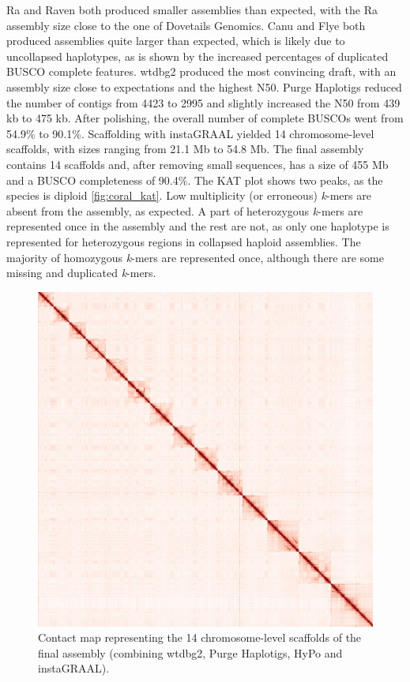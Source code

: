 Ra and Raven both produced smaller assemblies than expected, with the Ra assembly size close to the one of Dovetails Genomics. Canu and Flye both produced assemblies quite larger than expected, which is likely due to uncollapsed haplotypes, as is shown by the increased percentages of duplicated BUSCO complete features. wtdbg2 produced the most convincing draft, with an assembly size close to expectations and the highest N50. Purge Haplotigs reduced the number of contigs from 4423 to 2995 and slightly increased the N50 from 439 kb to 475 kb. After polishing, the overall number of complete BUSCOs went from 54.9\% to 90.1\%. Scaffolding with instaGRAAL yielded 14 chromosome-level scaffolds, with sizes ranging from 21.1 Mb to 54.8 Mb. The final assembly contains 14 scaffolds and, after removing small sequences, has a size of 455 Mb and a BUSCO completeness of 90.4\%. The KAT plot shows two peaks, as the species is diploid \ref{fig:coral_kat}. Low multiplicity (or erroneous) \textit{k}-mers are absent from the assembly, as expected. A part of heterozygous \textit{k}-mers are represented once in the assembly and the rest are not, as only one haplotype is represented for heterozygous regions in collapsed haploid assemblies. The majority of homozygous \textit{k}-mers are represented once, although there are some missing and duplicated \textit{k}-mers. \\

\begin{figure}[H]
    \centering
    \includegraphics[width=0.9\linewidth]{fig/apoculata_contact_map_bin200.png}
    \caption{Contact map representing the 14 chromosome-level scaffolds of the final assembly (combining wtdbg2, Purge Haplotigs, HyPo and instaGRAAL).}
    \label{fig:coral_contact_map}
\end{figure}

